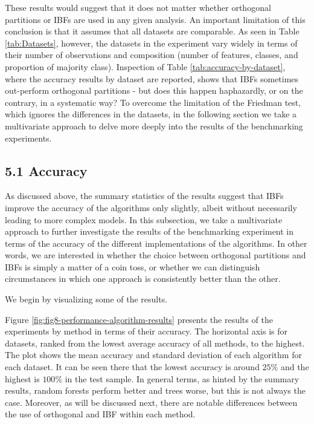 \documentclass[]{elsarticle} %
\begin{document}
These results would suggest that it does not matter whether orthogonal
partitions or IBFs are used in any given analysis. An important
limitation of this conclusion is that it assumes that all datasets are
comparable. As seen in Table \ref{tab:Datasets}, however, the datasets
in the experiment vary widely in terms of their number of observations
and composition (number of features, classes, and proportion of majority
class). Inspection of Table \ref{tab:accuracy-by-dataset}, where the
accuracy results by dataset are reported, shows that IBFs sometimes
out-perform orthogonal partitions - but does this happen haphazardly, or
on the contrary, in a systematic way? To overcome the limitation of the
Friedman test, which ignores the differences in the datasets, in the
following section we take a multivariate approach to delve more deeply
into the results of the benchmarking experiments.

\subsection{5.1 Accuracy}\label{accuracy}

As discussed above, the summary statistics of the results suggest that
IBFs improve the accuracy of the algorithms only slightly, albeit
without necessarily leading to more complex models. In this subsection,
we take a multivariate approach to further investigate the results of
the benchmarking experiment in terms of the accuracy of the different
implementations of the algorithms. In other words, we are interested in
whether the choice between orthogonal partitions and IBFs is simply a
matter of a coin toss, or whether we can distinguish circumstances in
which one approach is consistently better than the other.

We begin by visualizing some of the results.

Figure \ref{fig:fig8-performance-algorithm-results} presents the results
of the experiments by method in terms of their accuracy. The horizontal
axis is for datasets, ranked from the lowest average accuracy of all
methods, to the highest. The plot shows the mean accuracy and standard
deviation of each algorithm for each dataset. It can be seen there that
the lowest accuracy is around \(25\)\% and the highest is \(100\)\% in
the test sample. In general terms, as hinted by the summary results,
random forests perform better and trees worse, but this is not always
the case. Moreover, as will be discussed next, there are notable
differences between the use of orthogonal and IBF within each method.
\end{document}
